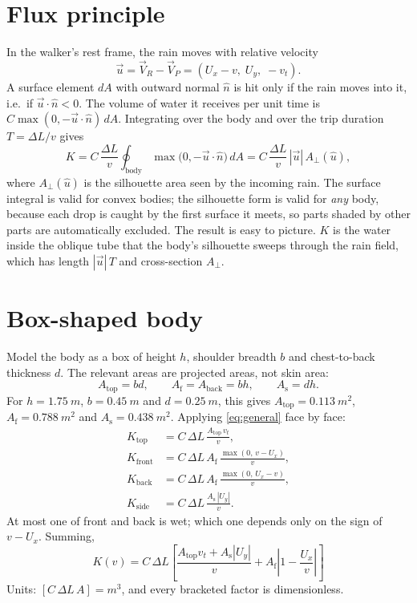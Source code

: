 \documentclass[11pt,a4paper]{article}
\newcommand{\VR}{\vec V_{\!R}}
\newcommand{\VP}{\vec V_{\!P}}
\newcommand{\Atop}{A_{\mathrm{top}}}
\newcommand{\Af}{A_{\mathrm{f}}}
\newcommand{\As}{A_{\mathrm{s}}}
\begin{document}
\section{Flux principle}\label{sec:flux}
In the walker's rest frame, the rain moves with relative velocity
\begin{equation}
\vec u=\VR-\VP=(U_x-v,\;U_y,\;-v_t).
\end{equation}
A surface element $dA$ with outward normal $\hat n$ is hit only if the rain moves into it, i.e.\ if $\vec u\cdot\hat n<0$. The volume of water it receives per unit time is $C\max(0,-\vec u\cdot\hat n)\,dA$. Integrating over the body and over the trip duration $T=\Delta L/v$ gives
\begin{equation}\label{eq:general}
K=C\,\frac{\Delta L}{v}\oint_{\text{body}}\max\!\big(0,-\vec u\cdot\hat n\big)\,dA
= C\,\frac{\Delta L}{v}\,|\vec u|\,A_\perp(\hat u),
\end{equation}
where $A_\perp(\hat u)$ is the silhouette area seen by the incoming rain. The surface integral is valid for convex bodies; the silhouette form is valid for \emph{any} body, because each drop is caught by the first surface it meets, so parts shaded by other parts are automatically excluded. The result is easy to picture. $K$ is the water inside the oblique tube that the body's silhouette sweeps through the rain field, which has length $|\vec u|\,T$ and cross-section $A_\perp$.

\section{Box-shaped body}\label{sec:box}
Model the body as a box of height $h$, shoulder breadth $b$ and chest-to-back thickness $d$. The relevant areas are projected areas, not skin area:
\begin{equation}
\Atop=bd,\qquad \Af=A_{\mathrm{back}}=bh,\qquad \As=dh .
\end{equation}
For $h=\SI{1.75}{m}$, $b=\SI{0.45}{m}$ and $d=\SI{0.25}{m}$, this gives $\Atop=\SI{0.113}{m^2}$, $\Af=\SI{0.788}{m^2}$ and $\As=\SI{0.438}{m^2}$. Applying \eqref{eq:general} face by face:
\begin{align}
K_{\mathrm{top}}&=C\,\Delta L\,\frac{\Atop\,v_t}{v},\\
K_{\mathrm{front}}&=C\,\Delta L\,\Af\,\frac{\max(0,\,v-U_x)}{v},\\
K_{\mathrm{back}}&=C\,\Delta L\,\Af\,\frac{\max(0,\,U_x-v)}{v},\\
K_{\mathrm{side}}&=C\,\Delta L\,\frac{\As\,|U_y|}{v}.
\end{align}
At most one of front and back is wet; which one depends only on the sign of $v-U_x$. Summing,
\begin{equation}\label{eq:box}
\boxed{K(v)=C\,\Delta L\left[\frac{\Atop v_t+\As|U_y|}{v}+\Af\left|1-\frac{U_x}{v}\right|\right]}
\end{equation}
Units: $[C\,\Delta L\,A]=\si{m^3}$, and every bracketed factor is dimensionless.
\end{document}
